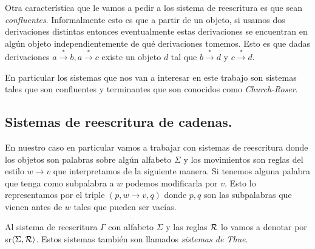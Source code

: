 \documentclass[tesis.tex]{subfiles}
\begin{document}
Otra característica que le vamos a pedir a los sistema de reescritura es que sean \emph{confluentes}. Informalmente esto es que a partir de un objeto, si usamos dos derivaciones distintas entonces eventualmente estas derivaciones se encuentran en algún objeto independientemente de qué derivaciones tomemos. Esto es que dadas derivaciones $a \overset{*}{\rightarrow} b, a \overset{*}{\rightarrow} c$ existe un objeto $d$ tal que $b \overset{*}{\rightarrow} d$ y $c \overset{*}{\rightarrow} d$.

En particular los sistemas que nos van a interesar en este trabajo son sistemas tales que son confluentes y terminantes que son conocidos como \emph{Church-Roser}.

\subsection{Sistemas de reescritura de cadenas.}
En nuestro caso en particular vamos a trabajar con sistemas de reescritura donde los objetos son palabras sobre algún alfabeto $\Sigma$ y los movimientos son reglas del estilo $w \to v$ que interpretamos de la siguiente manera. Si tenemos alguna palabra que tenga como subpalabra a $w$ podemos modificarla por $v$. Esto lo representamos por el triple $(p, w \to v, q)$ donde $p,q$ son las subpalabras que vienen antes de $w$ tales que pueden ser vacías. 

Al sistema de reescritura $\Gamma$ con alfabeto $\Sigma$ y las reglas $\cal R$ lo vamos a denotar por sr$\left< \Sigma, {\cal R} \right>$. Estos sistemas también son llamados \emph{sistemas de Thue}.
\end{document}
